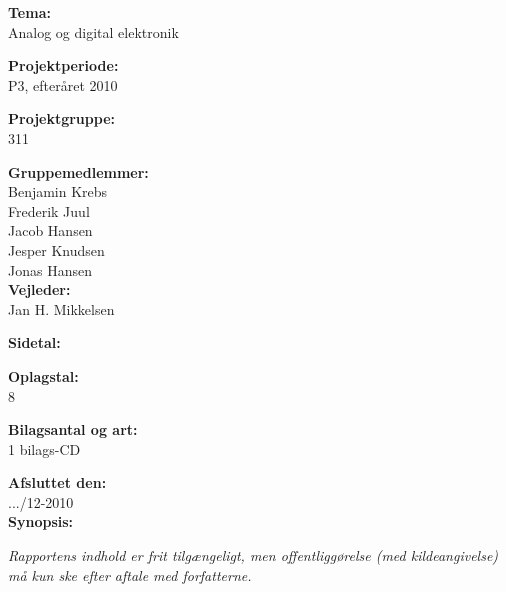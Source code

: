 \begin{multicols}{2}

\small{
\textbf{Tema:\\}
Analog og digital elektronik

\textbf{Projektperiode:\\}
P3, efteråret 2010

\textbf{Projektgruppe:\\}
311

\textbf{Gruppemedlemmer:\\}
Benjamin Krebs\\
Frederik Juul\\
Jacob Hansen\\
Jesper Knudsen\\
Jonas Hansen\\

\textbf{Vejleder:\\}
Jan H. Mikkelsen

\textbf{Sidetal:\\}
\pageref{LastPage}

\textbf{Oplagstal:\\}
8

\textbf{Bilagsantal og art:\\}
1 bilags-CD

\textbf{Afsluttet den:\\}
.../12-2010
\\
\textbf{Synopsis:}
}

\newline
\end{multicols}
\textit{\scriptsize{Rapportens indhold er frit tilgængeligt, men offentliggørelse (med kildeangivelse) må kun ske efter aftale med forfatterne.}}